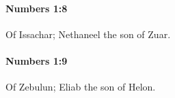 		\paragraph{Numbers 1:8} %
			\label{NUMBERS-1-8}

			Of Issachar; Nethaneel the son of Zuar.


		\paragraph{Numbers 1:9} %
			\label{NUMBERS-1-9}

			Of Zebulun; Eliab the son of Helon.


